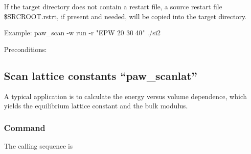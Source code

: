 \documentclass[final,12pt,makeidx,DIV=calc]{article}
\begin{document}
{{{{{{{\begin{minipage}{0.9\linewidth}
 If the target directory does not contain a restart file,
 a source restart file \$SRCROOT.rstrt, if present and needed,
 will be copied into the target directory.

 Example:
 	 paw\_scan -w run -r "EPW 20 30 40" ./si2
\end{minipage}}

\bigskip
\noindent Preconditions:\\[2mm]
\hspace*{1cm}
\bigskip
%
\subsection{Scan lattice constants ``paw\_scanlat''}
A typical application is to calculate the energy versus volume
dependence, which yields the equilibrium lattice constant and the bulk
modulus. 

\subsubsection{Command}
The calling sequence is

\bigskip{}
\vspace{0.5cm}

}}}}}}
\end{document}
